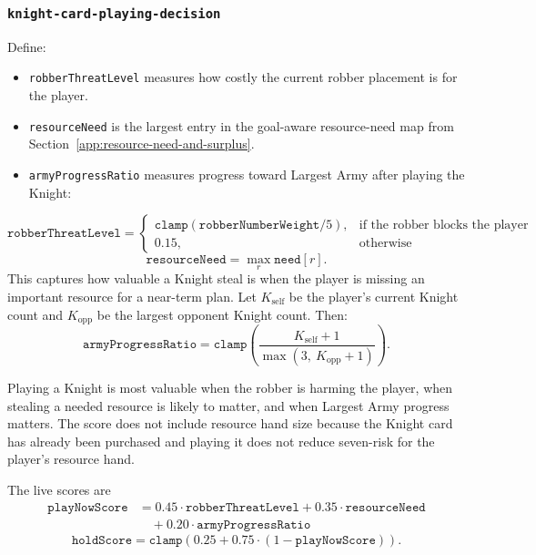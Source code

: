\documentclass[letter,  12 pt]{article}
\begin{document}
\subsubsection{\texttt{knight-card-playing-decision}}
\label{app:task-knight-card-playing-decision}
Define:
\begin{itemize}
    \item \texttt{robberThreatLevel} measures how costly the current robber placement is for the player.
    \item \texttt{resourceNeed} is the largest entry in the goal-aware resource-need map from Section~\ref{app:resource-need-and-surplus}.
    \item \texttt{armyProgressRatio} measures progress toward Largest Army after playing the Knight:
\end{itemize}
\[
\texttt{robberThreatLevel} =
\begin{cases}
\texttt{clamp}(\texttt{robberNumberWeight} / 5), & \text{if the robber blocks the player}\\
0.15, & \text{otherwise}
\end{cases}
\]
\[
\texttt{resourceNeed} = \max_r \texttt{need}[r].
\]
This captures how valuable a Knight steal is when the player is missing an important resource for a near-term plan.
Let $K_{\text{self}}$ be the player's current Knight count and $K_{\text{opp}}$ be the largest opponent Knight count. Then:
\[
\texttt{armyProgressRatio}
=
\texttt{clamp}\left(
\frac{K_{\text{self}} + 1}
{\max(3,\ K_{\text{opp}} + 1)}
\right).
\]

Playing a Knight is most valuable when the robber is harming the player, when stealing a needed resource is likely to matter, and when Largest Army progress matters. The score does not include resource hand size because the Knight card has already been purchased and playing it does not reduce seven-risk for the player's resource hand.

The live scores are
\[
\begin{aligned}
\texttt{playNowScore} &= 0.45 \cdot \texttt{robberThreatLevel} + 0.35 \cdot \texttt{resourceNeed} \\
&\quad + 0.20 \cdot \texttt{armyProgressRatio}
\end{aligned}
\]
\[
\texttt{holdScore} = \texttt{clamp}(0.25 + 0.75 \cdot (1 - \texttt{playNowScore})).
\]
\end{document}
